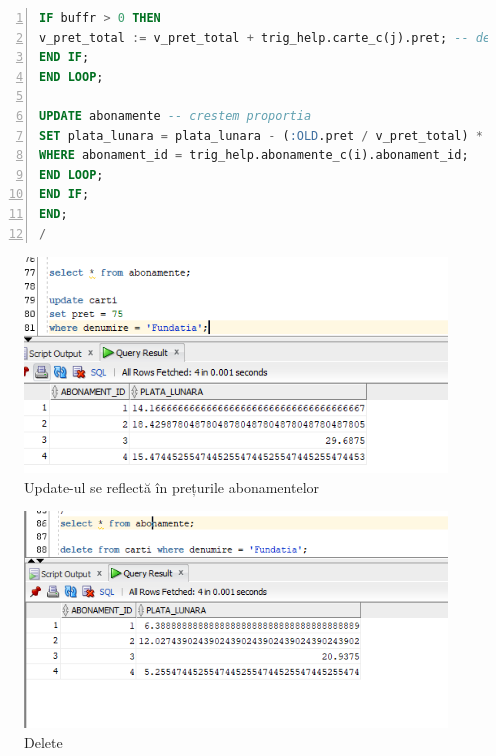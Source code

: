 \documentclass[12pt]{article}
\begin{document}
\begin{lstlisting}[language=SQL,
	showspaces=false,
	basicstyle=\ttfamily,
	numbers=left,
	numberstyle=\tiny,
	breaklines=true,
	commentstyle=\color{gray}]
IF buffr > 0 THEN
v_pret_total := v_pret_total + trig_help.carte_c(j).pret; -- deoarece valorile sunt luate cu un trigger before, e ca si cum am apela :OLD pt valoarea schimbata
END IF;
END LOOP;

UPDATE abonamente -- crestem proportia
SET plata_lunara = plata_lunara - (:OLD.pret / v_pret_total) * plata_lunara
WHERE abonament_id = trig_help.abonamente_c(i).abonament_id;
END LOOP;
END IF;
END;
/
\end{lstlisting}	
\begin{figure}[!htb]
	\includegraphics[max width=\linewidth]{imgs/ex11_1.png}
	\caption{Update-ul se reflectă în prețurile abonamentelor}
	\label{fig:ex11_1}
\end{figure}
\begin{figure}[!htb]
	\includegraphics[max width=\linewidth]{imgs/ex11_2.png}
	\caption{Delete}
	\label{fig:ex11_2}
\end{figure}
\end{document}

